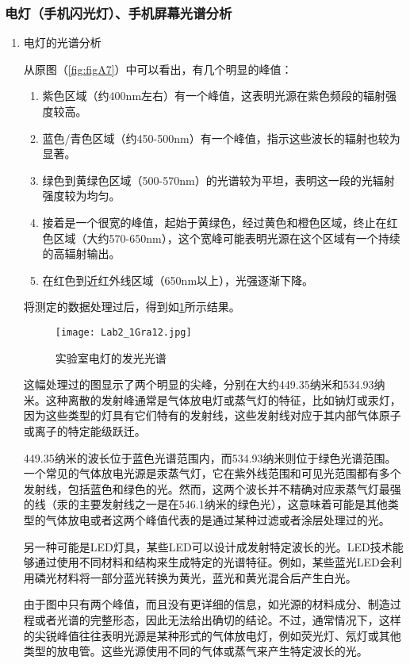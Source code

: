 \documentclass[dvipsnames, svgnames,a4paper,11pt]{article}
\begin{document}
	\subsubsection{电灯（手机闪光灯）、手机屏幕光谱分析}
	\begin{enumerate}
		\item 电灯的光谱分析
		
		从原图（\cref{fig:figA7}）中可以看出，有几个明显的峰值：
		
		\begin{enumerate}
			\item 紫色区域（约400nm左右）有一个峰值，这表明光源在紫色频段的辐射强度较高。
			\item 蓝色/青色区域（约450-500nm）有一个峰值，指示这些波长的辐射也较为显著。
			\item 绿色到黄绿色区域（500-570nm）的光谱较为平坦，表明这一段的光辐射强度较为均匀。
			\item 接着是一个很宽的峰值，起始于黄绿色，经过黄色和橙色区域，终止在红色区域（大约570-650nm），这个宽峰可能表明光源在这个区域有一个持续的高辐射输出。
			\item 在红色到近红外线区域（650nm以上），光强逐渐下降。
		\end{enumerate}
		
		将测定的数据处理过后，得到如\cref{fig:fig12}所示结果。
		
		\begin{figure}[htbp]
			\centering
			\texttt{[image: Lab2\_1Gra12.jpg]}
			\caption{实验室电灯的发光光谱}
			\label{fig:fig12}
		\end{figure}
		
		这幅处理过的图显示了两个明显的尖峰，分别在大约449.35纳米和534.93纳米。这种离散的发射峰通常是气体放电灯或蒸气灯的特征，比如钠灯或汞灯，因为这些类型的灯具有它们特有的发射线，这些发射线对应于其内部气体原子或离子的特定能级跃迁。
		
		449.35纳米的波长位于蓝色光谱范围内，而534.93纳米则位于绿色光谱范围。一个常见的气体放电光源是汞蒸气灯，它在紫外线范围和可见光范围都有多个发射线，包括蓝色和绿色的光。然而，这两个波长并不精确对应汞蒸气灯最强的线（汞的主要发射线之一是在546.1纳米的绿色光），这意味着可能是其他类型的气体放电或者这两个峰值代表的是通过某种过滤或者涂层处理过的光。
		
		另一种可能是LED灯具，某些LED可以设计成发射特定波长的光。LED技术能够通过使用不同材料和结构来生成特定的光谱特征。例如，某些蓝光LED会利用磷光材料将一部分蓝光转换为黄光，蓝光和黄光混合后产生白光。
		
		由于图中只有两个峰值，而且没有更详细的信息，如光源的材料成分、制造过程或者光谱的完整形态，因此无法给出确切的结论。不过，通常情况下，这样的尖锐峰值往往表明光源是某种形式的气体放电灯，例如荧光灯、氖灯或其他类型的放电管。这些光源使用不同的气体或蒸气来产生特定波长的光。
		

\end{enumerate}
\end{document}
